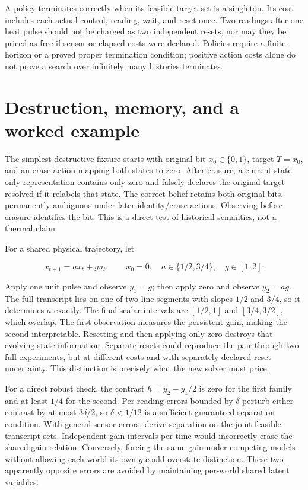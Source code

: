\documentclass[
  11pt,
  a4paper,
]{report}
\begin{document}
A policy terminates correctly when its feasible target set is a
singleton. Its cost includes each actual control, reading, wait, and
reset once. Two readings after one heat pulse should not be charged as
two independent resets, nor may they be priced as free if sensor or
elapsed costs were declared. Policies require a finite horizon or a
proved proper termination condition; positive action costs alone do not
prove a search over infinitely many histories terminates.

\hypertarget{destruction-memory-and-a-worked-example}{%
\section{Destruction, memory, and a worked
example}\label{destruction-memory-and-a-worked-example}}

The simplest destructive fixture starts with original bit
\(x_0\in\{0,1\}\), target \(T=x_0\), and an erase action mapping both
states to zero. After erasure, a current-state-only representation
contains only zero and falsely declares the original target resolved if
it relabels that state. The correct belief retains both original bits,
permanently ambiguous under later identity/erase actions. Observing
before erasure identifies the bit. This is a direct test of historical
semantics, not a thermal claim.

For a shared physical trajectory, let

\[
x_{t+1}=a x_t+g u_t,\qquad
x_0=0,\quad a\in\{1/2,3/4\},\quad g\in[1,2].
\]

Apply one unit pulse and observe \(y_1=g\); then apply zero and observe
\(y_2=ag\). The full transcript lies on one of two line segments with
slopes \(1/2\) and \(3/4\), so it determines \(a\) exactly. The final
scalar intervals are \([1/2,1]\) and \([3/4,3/2]\), which overlap. The
first observation measures the persistent gain, making the second
interpretable. Resetting and then applying only zero destroys that
evolving-state information. Separate resets could reproduce the pair
through two full experiments, but at different costs and with separately
declared reset uncertainty. This distinction is precisely what the new
solver must price.

For a direct robust check, the contrast \(h=y_2-y_1/2\) is zero for the
first family and at least \(1/4\) for the second. Per-reading errors
bounded by \(\delta\) perturb either contrast by at most \(3\delta/2\),
so \(\delta<1/12\) is a sufficient guaranteed separation condition. With
general sensor errors, derive separation on the joint feasible
transcript sets. Independent gain intervals per time would incorrectly
erase the shared-gain relation. Conversely, forcing the same gain under
competing models without allowing each world its own \(g\) could
overstate distinction. These two apparently opposite errors are avoided
by maintaining per-world shared latent variables.
\end{document}
